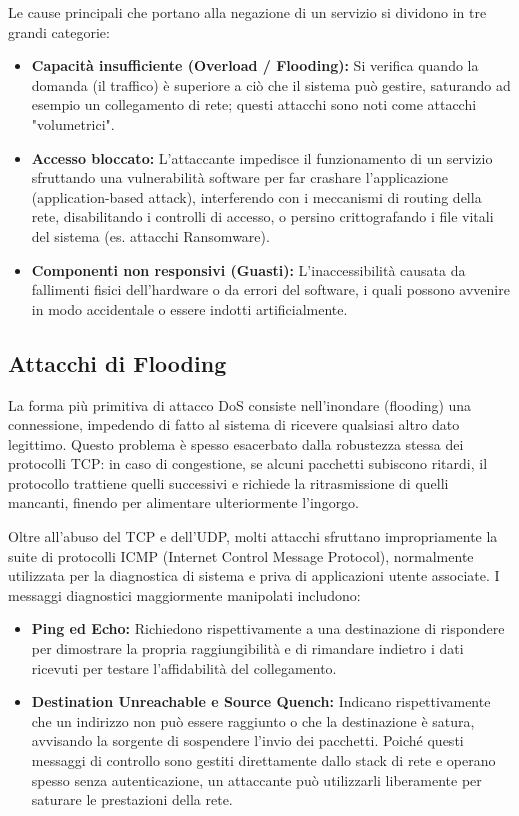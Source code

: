 \documentclass{article}
\begin{document}
Le cause principali che portano alla negazione di un servizio si dividono in tre grandi categorie:

\begin{itemize}
    \item \textbf{Capacità insufficiente (Overload / Flooding):} Si verifica quando la domanda (il traffico) è superiore a ciò che il sistema può gestire, saturando ad esempio un collegamento di rete; questi attacchi sono noti come attacchi "volumetrici".
    \item \textbf{Accesso bloccato:} L'attaccante impedisce il funzionamento di un servizio sfruttando una vulnerabilità software per far crashare l'applicazione (application-based attack), interferendo con i meccanismi di routing della rete, disabilitando i controlli di accesso, o persino crittografando i file vitali del sistema (es. attacchi Ransomware).
    \item \textbf{Componenti non responsivi (Guasti):} L'inaccessibilità causata da fallimenti fisici dell'hardware o da errori del software, i quali possono avvenire in modo accidentale o essere indotti artificialmente.
\end{itemize}

\subsection*{Attacchi di Flooding}

La forma più primitiva di attacco DoS consiste nell'inondare (flooding) una connessione, impedendo di fatto al sistema di ricevere qualsiasi altro dato legittimo. Questo problema è spesso esacerbato dalla robustezza stessa dei protocolli TCP: in caso di congestione, se alcuni pacchetti subiscono ritardi, il protocollo trattiene quelli successivi e richiede la ritrasmissione di quelli mancanti, finendo per alimentare ulteriormente l'ingorgo.

Oltre all'abuso del TCP e dell'UDP, molti attacchi sfruttano impropriamente la suite di protocolli ICMP (Internet Control Message Protocol), normalmente utilizzata per la diagnostica di sistema e priva di applicazioni utente associate. I messaggi diagnostici maggiormente manipolati includono:

\begin{itemize}
    \item \textbf{Ping ed Echo:} Richiedono rispettivamente a una destinazione di rispondere per dimostrare la propria raggiungibilità e di rimandare indietro i dati ricevuti per testare l'affidabilità del collegamento.
    \item \textbf{Destination Unreachable e Source Quench:} Indicano rispettivamente che un indirizzo non può essere raggiunto o che la destinazione è satura, avvisando la sorgente di sospendere l'invio dei pacchetti. Poiché questi messaggi di controllo sono gestiti direttamente dallo stack di rete e operano spesso senza autenticazione, un attaccante può utilizzarli liberamente per saturare le prestazioni della rete.
\end{itemize}
\end{document}
